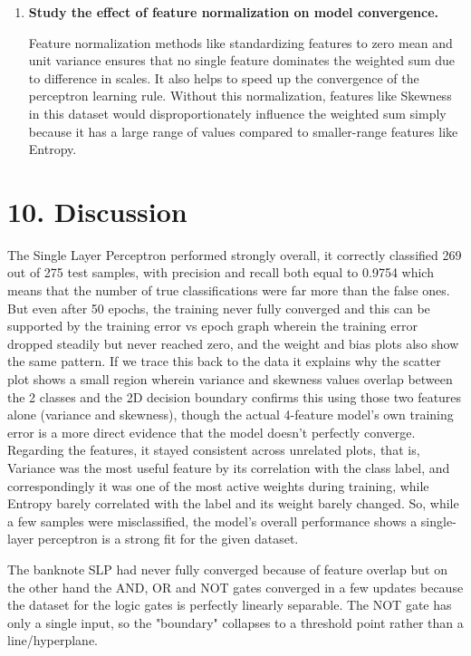 \documentclass[11pt,a4paper]{article}
\begin{document}
\begin{enumerate}[leftmargin=*]
\item \textbf{Study the effect of feature normalization on model convergence.}

Feature normalization methods like standardizing features to zero mean and unit variance ensures that no single feature dominates the weighted sum due to difference in scales. It also helps to speed up the convergence of the perceptron learning rule. Without this normalization, features like Skewness in this dataset would disproportionately influence the weighted sum simply because it has a large range of values compared to smaller-range features like Entropy.

\end{enumerate}


\section*{10. Discussion}

The Single Layer Perceptron performed strongly overall, it correctly classified 269 out of 275 test samples, with precision and recall both equal to 0.9754 which means that the number of true classifications were far more than the false ones. But even after 50 epochs, the training never fully converged and this can be supported by the training error vs epoch graph wherein the training error dropped steadily but never reached zero, and the weight and bias plots also show the same pattern. If we trace this back to the data it explains why the scatter plot shows a small region wherein variance and skewness values overlap between the 2 classes and the 2D decision boundary confirms this using those two features alone (variance and skewness), though the actual 4-feature model's own training error is a more direct evidence that the model doesn't perfectly converge. Regarding the features, it stayed consistent across unrelated plots, that is, Variance was the most useful feature by its correlation with the class label, and correspondingly it was one of the most active weights during training, while Entropy barely correlated with the label and its weight barely changed. So, while a few samples were misclassified, the model's overall performance shows a single-layer perceptron is a strong fit for the given dataset.

The banknote SLP had never fully converged because of feature overlap but on the other hand the AND, OR and NOT gates converged in a few updates because the dataset for the logic gates is perfectly linearly separable. The NOT gate has only a single input, so the "boundary" collapses to a threshold point rather than a line/hyperplane.
\end{document}
